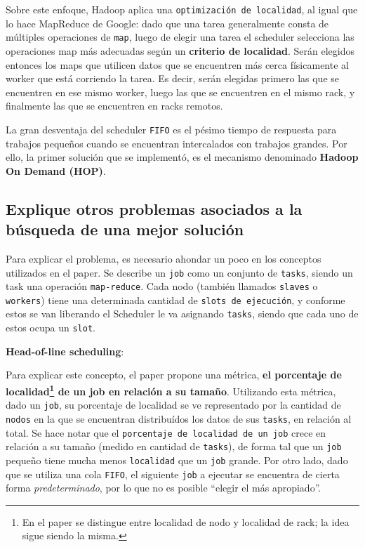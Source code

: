 \documentclass[11pt, a4paper, twoside]{article}
\begin{document}
Sobre este enfoque, Hadoop aplica una \texttt{optimización de localidad}, al
igual que lo hace MapReduce de Google: dado que una tarea generalmente consta de
múltiples operaciones de \texttt{map}, luego de elegir una tarea el scheduler
selecciona las operaciones map más adecuadas según un \textbf{criterio de
localidad}. Serán elegidos entonces los maps que utilicen datos que se
encuentren más cerca físicamente al worker que está corriendo la tarea. Es
decir, serán elegidas primero las que se encuentren en ese mismo worker, luego
las que se encuentren en el mismo rack, y finalmente las que se encuentren en
racks remotos.

La gran desventaja del scheduler \texttt{FIFO} es el pésimo tiempo de respuesta
para trabajos pequeños cuando se encuentran intercalados con trabajos grandes.
Por ello, la primer solución que se implementó, es el mecanismo denominado
\textbf{Hadoop On Demand (HOP)}.

\fixme

\clearpage
\subsection {\footnotesize Explique otros problemas asociados a la búsqueda de una mejor solución}
\label{investigacion-5}

Para explicar el problema, es necesario ahondar un poco en los conceptos
utilizados en el paper. Se describe un \texttt{job} como un conjunto de
\texttt{tasks}, siendo un task una operación \texttt{map-reduce}. Cada nodo
(también llamados \texttt{slaves} o \texttt{workers}) tiene una determinada
cantidad de \texttt{slots de ejecución}, y conforme estos se van liberando el
Scheduler le va asignando \texttt{tasks}, siendo que cada uno de estos ocupa
un \texttt{slot}.



\textbf{Head-of-line scheduling}:

Para explicar este concepto, el paper propone
una métrica, \textbf{el porcentaje de localidad\footnote{En el paper se
distingue entre localidad de nodo y localidad de rack; la idea sigue siendo la
misma.} de un job en relación a su tamaño}. Utilizando esta métrica, dado un
\texttt{job}, su porcentaje de localidad se ve representado por la cantidad de
\texttt{nodos} en la que se encuentran distribuídos los datos de sus
\texttt{tasks}, en relación al total. Se hace notar que el \texttt{porcentaje
de localidad de un job} crece en relación a su tamaño (medido en cantidad de
\texttt{tasks}), de forma tal que un \texttt{job} pequeño tiene mucha menos
\texttt{localidad} que un \texttt{job} grande. Por otro lado, dado que se
utiliza una cola \texttt{FIFO}, el siguiente \texttt{job} a ejecutar se
encuentra de cierta forma \emph{predeterminado}, por lo que no es posible
``elegir el más apropiado''.
\end{document}
